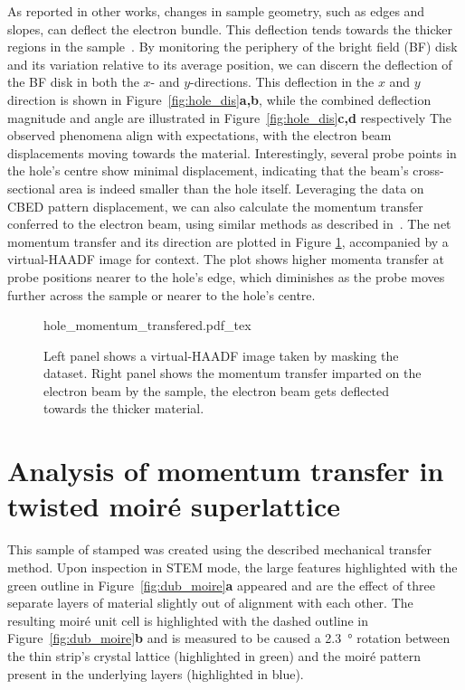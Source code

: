 %
As reported in other works, changes in sample geometry, such as edges and slopes, can deflect the electron bundle. 
%
This deflection tends towards the thicker regions in the sample~\cite{ophusFourDimensionalScanningTransmission2019a,dekkers1974differential}. 
%
By monitoring the periphery of the bright field (BF) disk and its variation relative to its average position, we can discern the deflection of the BF disk in both the $x$- and $y$-directions. 
%
This deflection in the $x$ and $y$ direction is shown in Figure~\ref{fig:hole_dis}\textbf{a,b}, while the combined deflection magnitude and angle are illustrated in Figure~\ref{fig:hole_dis}\textbf{c,d} respectively
%
The observed phenomena align with expectations, with the electron beam displacements moving towards the material. 
%
Interestingly, several probe points in the hole's centre show minimal displacement, indicating that the beam's cross-sectional area is indeed smaller than the hole itself.
%
Leveraging the data on CBED pattern displacement, we can also calculate the momentum transfer conferred to the electron beam, using similar methods as described in~\cite{mullerAtomicElectricFields2014}. 
%
The net momentum transfer and its direction are plotted in Figure \ref{fig:hole_mom}, accompanied by a virtual-HAADF image for context. 
%
The plot shows higher momenta transfer at probe positions nearer to the hole's edge, which diminishes as the probe moves further across the sample or nearer to the hole's centre.


\begin{figure}
    \centering
    \def\svgwidth{.75\linewidth}
    {hole_momentum_transfered.pdf_tex}
    \caption{Left panel shows a virtual-HAADF image taken by masking the dataset. Right panel shows the momentum transfer imparted on the electron beam by the sample, the electron beam gets deflected towards the thicker material.}
    \label{fig:hole_mom}
\end{figure}

\clearpage
\section{Analysis of momentum transfer in twisted  moiré superlattice}


This sample of stamped  was created using the described mechanical transfer method. Upon inspection in STEM mode, the large features highlighted with the green outline in Figure~\ref{fig:dub_moire}\textbf{a} appeared and are the effect of three separate layers of material slightly out of alignment with each other. 
%
The resulting moiré unit cell is highlighted with the dashed outline in Figure~\ref{fig:dub_moire}\textbf{b} and is measured to be caused a \SI{2.3}{\degree} rotation between the thin strip's crystal lattice (highlighted in green) and the moiré pattern present in the underlying layers (highlighted in blue).

